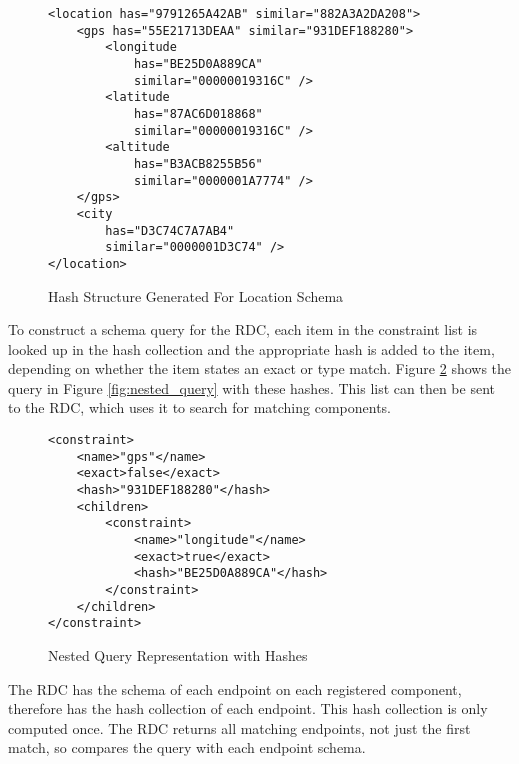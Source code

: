 \documentclass[12pt,twoside,notitlepage]{report}
\begin{document}
\begin{figure}[tbh]
\begin{lstlisting}
<location has="9791265A42AB" similar="882A3A2DA208">
	<gps has="55E21713DEAA" similar="931DEF188280">
		<longitude
			has="BE25D0A889CA" 
			similar="00000019316C" />
		<latitude
			has="87AC6D018868" 
			similar="00000019316C" />
		<altitude
			has="B3ACB8255B56" 
			similar="0000001A7774" />
	</gps>
	<city
		has="D3C74C7A7AB4"
		similar="0000001D3C74" />
</location>
\end{lstlisting}
\caption{Hash Structure Generated For Location Schema}
\label{fig:locationhashes}
\end{figure}

To construct a schema query for the RDC, each item in the constraint list is looked up in the hash collection and the appropriate hash is added to the item, depending on whether the item states an exact or type match. 
Figure \ref{fig:nested_query_hash} shows the query in Figure \ref{fig:nested_query} with these hashes. 
This list can then be sent to the RDC, which uses it to search for matching components. 

\begin{figure}[tbh]
\begin{lstlisting}
<constraint>
	<name>"gps"</name>
	<exact>false</exact>
	<hash>"931DEF188280"</hash>
	<children>
		<constraint>
			<name>"longitude"</name>
			<exact>true</exact>
			<hash>"BE25D0A889CA"</hash>
		</constraint>
	</children>
</constraint>
\end{lstlisting}
\caption{Nested Query Representation with Hashes}
\label{fig:nested_query_hash}
\end{figure}

The RDC has the schema of each endpoint on each registered component, therefore has the hash collection of each endpoint. 
This hash collection is only computed once. 
The RDC returns all matching endpoints, not just the first match, so compares the query with each endpoint schema. 
\end{document}
